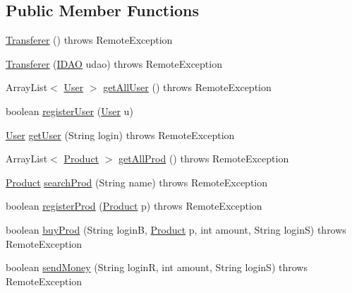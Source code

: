 \subsection*{Public Member Functions}
\begin{DoxyCompactItemize}
\item 
\hyperlink{classes_1_1deusto_1_1server_1_1remote_1_1_transferer_ad9465ee99430add24c3bf6badab21a91}{Transferer} ()  throws Remote\+Exception 
\item 
\hyperlink{classes_1_1deusto_1_1server_1_1remote_1_1_transferer_a1cd1f321e0f5650f8a37907e8cb23840}{Transferer} (\hyperlink{interfacees_1_1deusto_1_1server_1_1db_1_1dao_1_1_i_d_a_o}{I\+D\+AO} udao)  throws Remote\+Exception 
\item 
Array\+List$<$ \hyperlink{classes_1_1deusto_1_1server_1_1db_1_1data_1_1_user}{User} $>$ \hyperlink{classes_1_1deusto_1_1server_1_1remote_1_1_transferer_a613c0c3af149140e58488ce9d0745593}{get\+All\+User} ()  throws Remote\+Exception
\item 
boolean \hyperlink{classes_1_1deusto_1_1server_1_1remote_1_1_transferer_a80e2dd7db595bdd8d39969e5d0e8ae7b}{register\+User} (\hyperlink{classes_1_1deusto_1_1server_1_1db_1_1data_1_1_user}{User} u)
\item 
\hyperlink{classes_1_1deusto_1_1server_1_1db_1_1data_1_1_user}{User} \hyperlink{classes_1_1deusto_1_1server_1_1remote_1_1_transferer_a16976959aeb3080244422aeac061a23b}{get\+User} (String login)  throws Remote\+Exception
\item 
Array\+List$<$ \hyperlink{classes_1_1deusto_1_1server_1_1db_1_1data_1_1_product}{Product} $>$ \hyperlink{classes_1_1deusto_1_1server_1_1remote_1_1_transferer_a29cbb75edeb4e0973780fd379ef2b3fb}{get\+All\+Prod} ()  throws Remote\+Exception
\item 
\hyperlink{classes_1_1deusto_1_1server_1_1db_1_1data_1_1_product}{Product} \hyperlink{classes_1_1deusto_1_1server_1_1remote_1_1_transferer_ad6759f696eddd682b750f92ec41d1fcb}{search\+Prod} (String name)  throws Remote\+Exception
\item 
boolean \hyperlink{classes_1_1deusto_1_1server_1_1remote_1_1_transferer_a64c1f3b57b74106df83335b124937afe}{register\+Prod} (\hyperlink{classes_1_1deusto_1_1server_1_1db_1_1data_1_1_product}{Product} p)  throws Remote\+Exception
\item 
boolean \hyperlink{classes_1_1deusto_1_1server_1_1remote_1_1_transferer_ad5868dd67ee9a53e7cdf0c30e08a3a1b}{buy\+Prod} (String loginB, \hyperlink{classes_1_1deusto_1_1server_1_1db_1_1data_1_1_product}{Product} p, int amount, String loginS)  throws Remote\+Exception
\item 
boolean \hyperlink{classes_1_1deusto_1_1server_1_1remote_1_1_transferer_ad1eb84155ba0c457645f2ad53725320d}{send\+Money} (String loginR, int amount, String loginS)  throws Remote\+Exception 
\end{DoxyCompactItemize}


